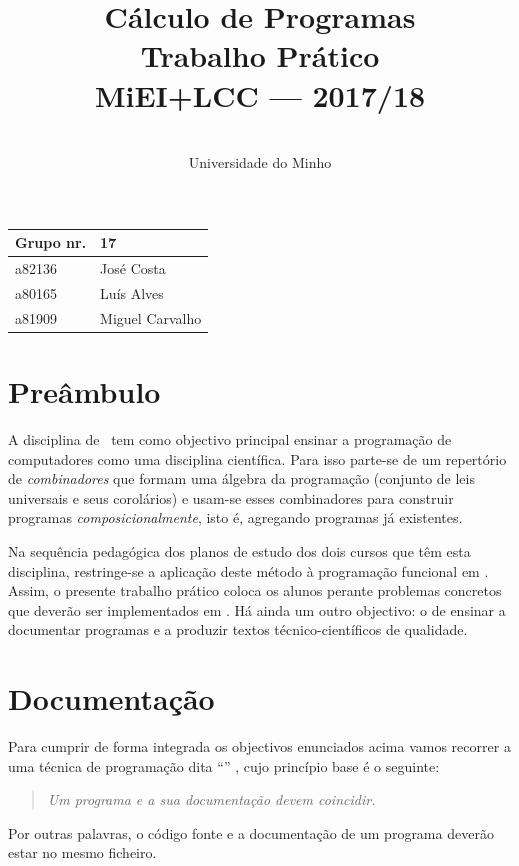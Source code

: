 \documentclass[a4paper]{article}
\title{
       	    Cálculo de Programas
\\
       	Trabalho Prático
\\
       	MiEI+LCC --- 2017/18
}
\author{
       	\dium
\\
       	Universidade do Minho
}
\date\mydate
\begin{document}
\maketitle

\begin{center}\large
\begin{tabular}{ll}
\textbf{Grupo} nr. & 17
\\\hline
a82136 & José Costa
\\
a80165 & Luís Alves
\\
a81909 & Miguel Carvalho
\end{tabular}
\end{center}

\section{Preâmbulo}

A disciplina de \CP\ tem como objectivo principal ensinar
a progra\-mação de computadores como uma disciplina científica. Para isso
parte-se de um repertório de \emph{combinadores} que formam uma álgebra da
programação (conjunto de leis universais e seus corolários) e usam-se esses
combinadores para construir programas \emph{composicionalmente}, isto é,
agregando programas já existentes.

Na sequência pedagógica dos planos de estudo dos dois cursos que têm esta
disciplina, restringe-se a aplicação deste método à programação funcional
em \Haskell. Assim,
o presente trabalho prático coloca os alunos perante problemas
concretos que deverão ser implementados em \Haskell.
Há ainda um outro objectivo: o de ensinar a documentar programas e
a produzir textos técnico-científicos de qualidade.

\section{Documentação}
Para cumprir de forma integrada os objectivos enunciados acima vamos recorrer
a uma técnica de programa\-ção dita ``'' \cite{Kn92}, cujo
princípio base é o seguinte:
\begin{quote}\em
Um programa e a sua documentação devem coincidir.
\end{quote}
Por outras palavras, o código fonte e a documentação de um programa deverão estar no
mesmo ficheiro.
\end{document}
